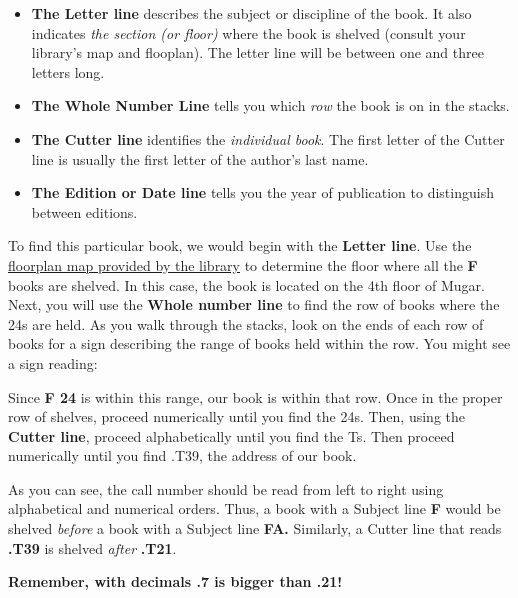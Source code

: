 \documentclass[book]{memoir}
\begin{document}
\begin{itemize}
\item \textbf{The Letter line} describes the subject or discipline of the book. It also indicates \emph{the section (or floor)} where the book is shelved (consult your library's map and flooplan). The letter line will be between one and three letters long.
\item \textbf{The Whole Number Line} tells you which \emph{row} the book is on in the stacks. 
\item \textbf{The Cutter line} identifies the \emph{individual book}. The first letter of the Cutter line is usually the first letter of the author's last name.
\item \textbf{The Edition or Date line} tells you the year of publication to distinguish between editions.
\end{itemize}

To find this particular book, we would begin with the \textbf{Letter line}. Use the \href{http://www.bu.edu/library/mugar-memorial/about/floorplans/#f=floor-1}{floorplan map provided by the library} to determine the floor where all the \textbf{F }books are shelved. In this case, the book is located on the 4th floor of Mugar. Next, you will use the \textbf{Whole number line} to find the row of books where the 24s are held. As you walk through the stacks, look on the ends of each row of books for a sign describing the range of books held within the row. You might see a sign reading:

\begin{quote}
\hspace{.4in}{\huge F 7.4\textendash F 45.2}
\end{quote}

Since \textbf{F 24} is within this range, our book is within that row. Once in the proper row of shelves, proceed numerically until you find the 24s. Then, using the \textbf{Cutter line}, proceed alphabetically until you find the Ts. Then proceed numerically until you find .T39, the address of our book. 

As you can see, the call number should be read from left to right using alphabetical and numerical orders. Thus, a book with a Subject line \textbf{F }would be shelved \emph{before} a book with a Subject line \textbf{FA.} Similarly, a Cutter line that reads \textbf{.T39} is shelved \emph{after} \textbf{.T21}. 

\hspace{.4in}\textbf{Remember, with decimals .7 is bigger than .21!}
\end{document}
